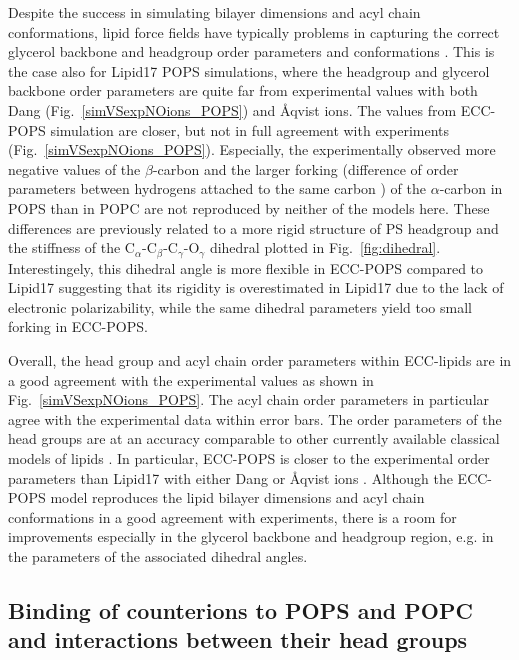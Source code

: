 \documentclass[journal=jpcbfk,manuscript=article]{achemso}
\begin{document}
Despite the success in simulating bilayer dimensions and acyl chain conformations,
lipid force fields have typically problems in capturing the correct glycerol backbone and
headgroup order parameters and conformations \cite{botan15,ollila16,NMRlipidsIV}.
This is the case also for Lipid17 POPS simulations, where the headgroup and glycerol backbone
order parameters are quite far from experimental values with both Dang (Fig.~\ref{simVSexpNOions_POPS})
and {\AA}qvist ions. \cite{NMRlipidsIV} The values from ECC-POPS simulation are closer,
but not in full agreement with experiments (Fig.~\ref{simVSexpNOions_POPS}).
Especially, the experimentally observed more negative values of the $\beta$-carbon
and the larger forking (difference of order parameters between hydrogens attached to the
same carbon \cite{ollila16}) of the $\alpha$-carbon in POPS than in POPC \cite{NMRlipidsIV}
are not reproduced by neither of the models here. 
These differences are previously related
to a more rigid structure of PS headgroup \cite{browning80,buldt81} and 
the stiffness of the C$_\alpha$-C$_\beta$-C$_\gamma$-O$_\gamma$ dihedral \cite{NMRlipidsIV}
plotted in Fig.~\ref{fig:dihedral}. 
Interestingely, this dihedral angle is more flexible in ECC-POPS compared to Lipid17 
suggesting that its rigidity is overestimated in Lipid17 due to the lack of electronic polarizability,
while the same dihedral parameters yield too small forking in ECC-POPS.


Overall,
the head group and acyl chain order parameters within ECC-lipids
are in a good agreement with the experimental values 
as shown in Fig.~\ref{simVSexpNOions_POPS}. 
The acyl chain order parameters in particular agree with the experimental data within error bars.
The order parameters of the head groups are at an accuracy comparable to 
other currently available classical models of lipids \citep{botan15, catte16, Pluhackova2016, nmrlipids_proj4}. 
In particular, ECC-POPS is closer to the experimental order parameters 
than Lipid17 with either Dang \cite{smith94,chang1999,dang2006} 
or {\AA}qvist ions \cite{aqvist90}. 
Although the ECC-POPS model reproduces the lipid bilayer dimensions and
acyl chain conformations in a good agreement with experiments, 
there is a room for improvements especially in the glycerol backbone and headgroup region,
e.g. in the parameters of the associated dihedral angles. 
\cite{botan15, ollila16, Pluhackova2016, NMRlipidsIV}




 
\subsection{Binding of counterions to POPS and POPC and interactions between their head groups}
\end{document}
